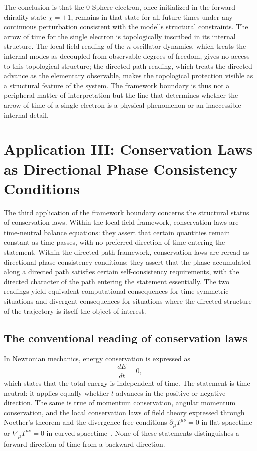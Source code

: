 \documentclass[%
 reprint, amsmath,amssymb, aps, prb, ]{revtex4-2}
\numberwithin{equation}{section}
\begin{document}
The conclusion is that the 0-Sphere electron, once initialized in the forward-chirality state $\chi = +1$, remains in that state for all future times under any continuous perturbation consistent with the model's structural constraints. The arrow of time for the single electron is topologically inscribed in its internal structure. The local-field reading of the $n$-oscillator dynamics, which treats the internal modes as decoupled from observable degrees of freedom, gives no access to this topological structure; the directed-path reading, which treats the directed advance as the elementary observable, makes the topological protection visible as a structural feature of the system. The framework boundary is thus not a peripheral matter of interpretation but the line that determines whether the arrow of time of a single electron is a physical phenomenon or an inaccessible internal detail.


\section{Application III: Conservation Laws as Directional Phase Consistency Conditions}
\label{sec:directional_laws}

The third application of the framework boundary concerns the structural status of conservation laws. Within the local-field framework, conservation laws are time-neutral balance equations: they assert that certain quantities remain constant as time passes, with no preferred direction of time entering the statement. Within the directed-path framework, conservation laws are reread as directional phase consistency conditions: they assert that the phase accumulated along a directed path satisfies certain self-consistency requirements, with the directed character of the path entering the statement essentially. The two readings yield equivalent computational consequences for time-symmetric situations and divergent consequences for situations where the directed structure of the trajectory is itself the object of interest.

\subsection{The conventional reading of conservation laws}
\label{sec:conventional_reading}

In Newtonian mechanics, energy conservation is expressed as
\begin{equation}
\frac{dE}{dt} = 0,
\label{eq:energy_conservation_newtonian}
\end{equation}
which states that the total energy is independent of time. The statement is time-neutral: it applies equally whether $t$ advances in the positive or negative direction. The same is true of momentum conservation, angular momentum conservation, and the local conservation laws of field theory expressed through Noether's theorem and the divergence-free conditions $\partial_\mu T^{\mu\nu} = 0$ in flat spacetime or $\nabla_\mu T^{\mu\nu} = 0$ in curved spacetime~\cite{Wald1984}. None of these statements distinguishes a forward direction of time from a backward direction.
\end{document}
